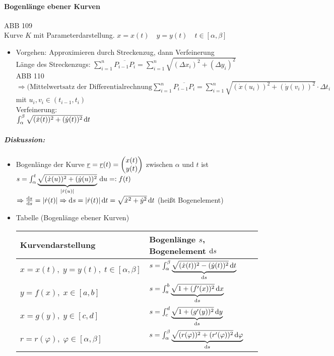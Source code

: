\paragraph{Bogenlänge ebener Kurven}\parskp
ABB 109\\
Kurve $K$ mit Parameterdarstellung. $x=x(t) \quad y = y(t) \quad t \in [\alpha, \beta]$
\begin{itemize}
\item Vorgehen: Approximieren durch Streckenzug, dann Verfeinerung\\
Länge des Streckenzugs: $\sum_{i=1}^n \overline{P_{i-1}P_i}=\sum_{i=1}^n \sqrt{(\Delta x_i)^2+(\Delta y_i)^2}$\\
ABB 110\\
$\Rightarrow \text{(Mittelwertsatz der Differentialrechnung} \sum_{i=1}^n \overline{P_{i-1}P_i}= \sum_{i=1}^n \sqrt{(\dot{x}(u_i))^2 + (\dot{y}(v_i))^2}\cdot \Delta t_i$\\
mit $u_i, v_i\in (t_{i-1},t_i)$\\
Verfeinerung:\\
$\int_{\alpha}^{\beta} \sqrt{(\dot{x}(t))^2 + (\dot{y}(t))^2}\,\mathrm{d}t$
\end{itemize}
\subparagraph{Diskussion:}
\begin{itemize}
\item Bogenlänge der Kurve $\underline{r} = \underline{r}(t) = \begin{pmatrix}x(t) \\ y(t)\end{pmatrix}$ zwischen $\alpha$ und $t$ ist\\
$s=\int_{\alpha}^t \underbrace{\sqrt{(\dot{x}(u))^2 + (\dot{y}(u))^2}}_{|\dot{r}(u)|}\,\mathrm{d}u =: f(t)$\\
$\Rightarrow \frac{\mathrm{d}s}{\mathrm{d}s}= |\dot{r}(t)| \Rightarrow \mathrm{d}s=|\dot{r}(t)| \,\mathrm{d}t=\sqrt{\dot{x}^2+\dot{y}^2}\,\mathrm{d}t$ (heißt Bogenelement)
\item Tabelle (Bogenlänge ebener Kurven)\\
\begin{tabular}{l | l}
Kurvendarstellung & Bogenlänge $s$, Bogenelement $\mathrm{d}s$\\ 
\hline
$x=x(t),\; y=y(t),\; t \in [\alpha,\beta]$ & $s= \int_{\alpha}^{\beta} \underbrace{\sqrt{(\dot{x}(t))^2-(\dot{y}(t))^2}\,\mathrm{d}t}_{\mathrm{d}s}$\\
$y =f(x),\; x\in [a,b]$ & $s=\int_a^b\underbrace{\sqrt{1+(f'(x))^2}\,\mathrm{d}x}_{\mathrm{d}s}$\\
$x= g(y), \; y \in [c,d] $ & $s=\int_c^d\underbrace{\sqrt{1+(g'(y))^2}\,\mathrm{d}y}_{\mathrm{d}s}$\\
$r=r(\varphi), \; \varphi\in [\alpha, \beta]$ & $s=\int_{\alpha}^{\beta}\underbrace{\sqrt{(r(\varphi))^2+(r'(\varphi))^2}\,\mathrm{d}\varphi}_{\mathrm{d}s}$
\end{tabular}
\end{itemize}
